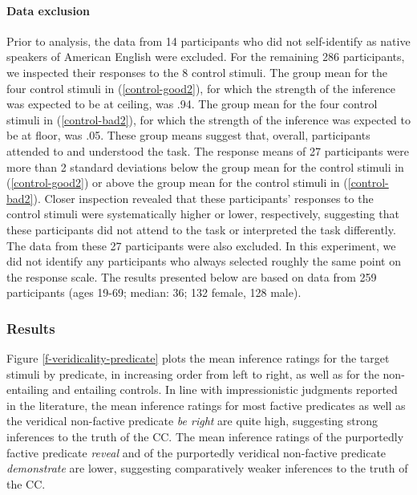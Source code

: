 \documentclass[11pt,fleqn]{article}
\newcommand{\6}{\mbox{$[\hspace*{-.6mm}[$}}
\newcommand{\9}{\mbox{$]\hspace*{-.6mm}]$}}
\begin{document}
\paragraph{Data exclusion}

Prior to analysis, the data from 14 participants who did not self-identify as native speakers of American English were excluded. For the remaining 286 participants, we inspected their responses to the 8 control stimuli. The group mean for the four control stimuli in (\ref{control-good2}), for which the strength of the inference was expected to be at ceiling, was .94. The group mean for the four control stimuli in (\ref{control-bad2}), for which the strength of the inference was expected to be at floor, was .05. These group means suggest that, overall, participants attended to and understood the task. The response means of 27 participants were more than 2 standard deviations below the group mean for the control stimuli in (\ref{control-good2}) or above the group mean for the control stimuli in (\ref{control-bad2}). Closer inspection revealed that these participants' responses to the control stimuli were systematically higher or lower, respectively, suggesting that these participants did not attend to the task or interpreted the task differently. The data from these 27 participants were also excluded. In this experiment, we did not identify any participants who always selected roughly the same point on the response scale. The results presented below are based on data from 259 participants (ages 19-69; median: 36; 132 female, 128 male). %

\subsubsection{Results}


Figure \ref{f-veridicality-predicate} plots the mean inference ratings for the target stimuli by predicate, in increasing order from left to right, as well as for the non-entailing and entailing controls. In line with impressionistic judgments reported in the literature, the mean inference ratings for most factive predicates as well as the veridical non-factive predicate {\em be right} are quite high, suggesting strong inferences to the truth of the CC. The mean inference ratings of the purportedly factive predicate {\em reveal} and of the purportedly veridical non-factive predicate {\em demonstrate} are lower, suggesting comparatively weaker inferences to the truth of the CC. 
\end{document}
